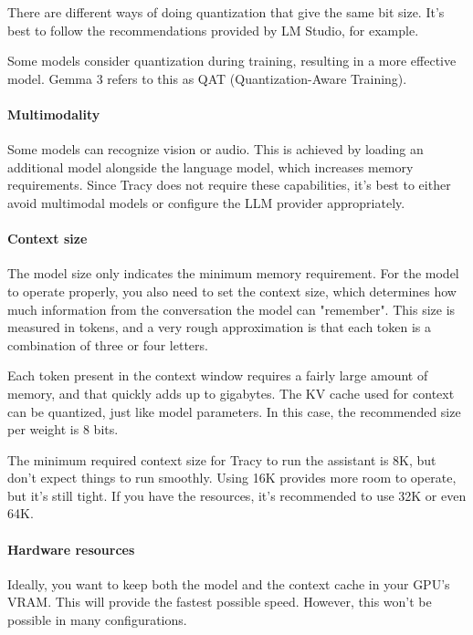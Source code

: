 \documentclass[hidelinks,titlepage,a4paper,twoside]{article}
\begin{document}
There are different ways of doing quantization that give the same bit size. It's best to follow the recommendations provided by LM Studio, for example.

Some models consider quantization during training, resulting in a more effective model. Gemma 3 refers to this as QAT (Quantization-Aware Training).

\paragraph{Multimodality}

Some models can recognize vision or audio. This is achieved by loading an additional model alongside the language model, which increases memory requirements. Since Tracy does not require these capabilities, it's best to either avoid multimodal models or configure the LLM provider appropriately.

\paragraph{Context size}

The model size only indicates the minimum memory requirement. For the model to operate properly, you also need to set the context size, which determines how much information from the conversation the model can "remember". This size is measured in tokens, and a very rough approximation is that each token is a combination of three or four letters.

Each token present in the context window requires a fairly large amount of memory, and that quickly adds up to gigabytes. The KV cache used for context can be quantized, just like model parameters. In this case, the recommended size per weight is 8 bits.

The minimum required context size for Tracy to run the assistant is 8K, but don't expect things to run smoothly. Using 16K provides more room to operate, but it's still tight. If you have the resources, it's recommended to use 32K or even 64K.

\paragraph{Hardware resources}

Ideally, you want to keep both the model and the context cache in your GPU's VRAM. This will provide the fastest possible speed. However, this won't be possible in many configurations.
\end{document}
